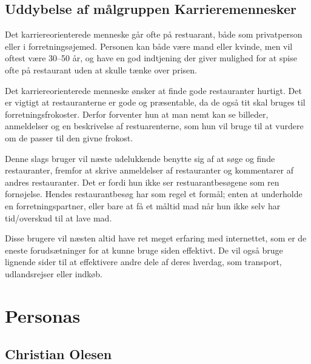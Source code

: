 \documentclass[a4paper, 12pt]{article}
\begin{document}
\subsection{Uddybelse af målgruppen Karrieremennesker}
Det karriereorienterede menneske går ofte på restuarant, både som privatperson
eller i forretningsøjemed. Personen kan både være mand eller kvinde, men vil
oftest være 30--50 år, og have en god indtjening der giver mulighed for at spise
ofte på restaurant uden at skulle tænke over prisen.

Det karriereorienterede menneske ønsker at finde gode restauranter hurtigt. Det
er vigtigt at restauranterne er gode og præsentable, da de også tit skal bruges
til forretningsfrokoster. Derfor forventer hun at man nemt kan se billeder,
anmeldelser og en beskrivelse af restuarenterne, som hun vil bruge til at
vurdere om de passer til den givne frokost. 

Denne slags bruger vil næste udelukkende benytte sig af at søge og finde
restauranter, fremfor at skrive anmeldelser af restauranter og kommentarer af
andres restauranter. Det er fordi hun ikke ser restuarantbesøgene som ren
fornøjelse. Hendes restaurantbesøg har som regel et formål; enten at underholde
en forretningspartner, eller bare at få et måltid mad når hun ikke selv har
tid/overskud til at lave mad. 

Disse brugere vil næsten altid have ret meget erfaring med internettet, som er
de eneste forudsætninger for at kunne bruge siden effektivt. De vil også bruge
lignende sider til at effektivere andre dele af deres hverdag, som transport,
udlandsrejser eller indkøb.

\section{Personas}
\label{sec:Personas}

\subsection{Christian Olesen}
\end{document}
